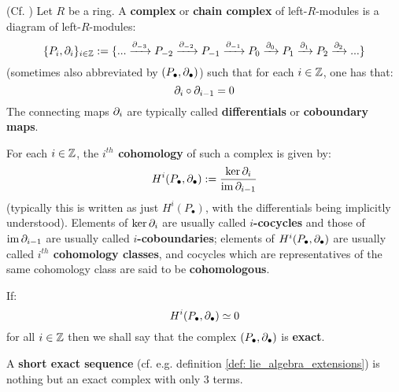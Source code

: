         \begin{definition} \label{def: complexes_and_cohomology}
            (Cf. \cite[Section IV.1]{hilton_stammbach_homological_algebra}) Let $R$ be a ring. A \textbf{complex} or \textbf{chain complex} of left-$R$-modules is a diagram of left-$R$-modules:
                $$\{P_i, \partial_i\}_{i \in \mathbb{Z}} := \{ ... \xrightarrow[]{\partial_{-3}} P_{-2} \xrightarrow[]{\partial_{-2}} P_{-1} \xrightarrow[]{\partial_{-1}} P_0 \xrightarrow[]{\partial_0} P_1 \xrightarrow[]{\partial_1} P_2 \xrightarrow[]{\partial_2} ... \}$$
            (sometimes also abbreviated by $(P_{\bullet}, \partial_{\bullet})$) such that for each $i \in \mathbb{Z}$, one has that:
                $$\partial_i \circ \partial_{i - 1} = 0$$
            The connecting maps $\partial_i$ are typically called \textbf{differentials} or \textbf{coboundary maps}.
            
            For each $i \in \mathbb{Z}$, the \textbf{$i^{th}$ cohomology} of such a complex is given by:
                $$H^i(P_{\bullet}, \partial_{\bullet}) := \frac{ \ker \partial_i }{ \operatorname{im} \partial_{i - 1} }$$
            (typically this is written as just $H^i(P_{\bullet})$, with the differentials being implicitly understood). Elements of $\ker \partial_i$ are usually called \textbf{$i$-cocycles} and those of $\operatorname{im} \partial_{i - 1}$ are usually called \textbf{$i$-coboundaries}; elements of $H^i(P_{\bullet}, \partial_{\bullet})$ are usually called \textbf{$i^{th}$ cohomology classes}, and cocycles which are representatives of the same cohomology class are said to be \textbf{cohomologous}.
            
            If:
                $$H^i(P_{\bullet}, \partial_{\bullet}) \simeq 0$$
            for all $i \in \mathbb{Z}$ then we shall say that the complex $(P_{\bullet}, \partial_{\bullet})$ is \textbf{exact}.
        \end{definition}
        \begin{example}
            A \textbf{short exact sequence} (cf. e.g. definition \ref{def: lie_algebra_extensions}) is nothing but an exact complex with only 3 terms. 
        \end{example}
        
